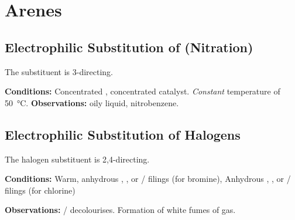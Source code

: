 




	\pagebreak
	\section{Arenes}

		\subsection{Electrophilic Substitution of  (Nitration)}

			The  substituent is 3-directing.

			\vspace{1.5em}
			\vbox{\textbf{Conditions:}	\tabto{35mm}Concentrated , concentrated  catalyst.
										\tabto{35mm}\textit{Constant} temperature of \SI{50}{\celsius}.}
			\vspace{0.75em}
			\vbox{\textbf{Observations:}\tabto{35mm} oily liquid, nitrobenzene.}





		\subsection{Electrophilic Substitution of Halogens}

			The halogen substituent is 2,4-directing.

			\vspace{1.5em}
			\vbox{\textbf{Conditions:}	\tabto{35mm}Warm, anhydrous , , or  / \ch{\Al} filings (for bromine),
										\tabto{35mm}Anhydrous , , or
													 / \ch{\Al} filings (for chlorine)}

			\vspace{0.75em}
			\vbox{\textbf{Observations:}\tabto{35mm}  /   decolourises.
										\tabto{35mm}Formation of white fumes of  gas.}

